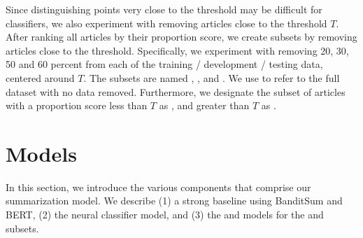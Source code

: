 Since distinguishing points very close to the threshold may be difficult for classifiers, we also experiment with removing articles close to the threshold $T$. After ranking all articles by their proportion score, we create subsets by removing articles close to the threshold. Specifically, we experiment with removing 20, 30, 50 and 60 percent from each of the training / development / testing data, centered around $T$. The subsets are named \Dtwenty, \Dthirty, \Dfifty{} and \Dsixty. We use \Dall{} to refer to the full dataset with no data removed. Furthermore, we designate the subset of articles with a proportion score less than $T$ as \Dlate, and greater than $T$ as \Dearly.

\section{Models}
In this section, we introduce the various components that comprise our summarization model. We describe (1) a strong baseline using BanditSum and BERT, (2) the neural classifier model, and (3) the \BanSumEarly{} and \BanSumLate{} models for the \Dearly{} and \Dlate{} subsets.


